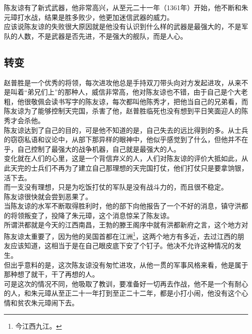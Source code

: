 \begin{multicols}{\theparacolNo}
陈友谅有了新式武器，他非常高兴，从至元二十一年（1361年）开始，他不断和朱元璋打水战，结果是胜多败少，他更加迷信武器的威力。\\

应该说陈友谅的失败很大原因就是他没有认识到什么样的武器是最强大的，不是军队的人数，不是武器是否先进，不是强大的舰队，而是人心。\\

\subsection{转变}
赵普胜是一个优秀的将领，每次进攻他总是手持双刀带头向对方发起进攻，从来不是叫着“弟兄们上”的那种人，威信非常高，他对陈友谅也不错，由于自己是个大老粗，他很敬佩会读书写字的陈友谅，每次都叫他陈秀才，把他当自己的兄弟看，而陈友谅为了能够控制天完国，杀害了他，赵普胜临死也没有想到平日笑面迎人的陈秀才会杀他。\\

陈友谅达到了自己的目的，可是他不知道的是，自己失去的远比得到的多。从士兵的窃窃私语和议论中，从部下那异样的眼神中，他似乎感觉到了什么，但他并不在乎，自己控制了最强大的战争机器，自己就是最强大的人。\\

变化就在人们的心里，这是一个背信弃义的人，人们对陈友谅的评价大抵如此，从此天完的士兵们不再为了建立自己那理想的天完国打仗，他们打仗只是要拿饷银，活下去。\\

而一支没有理想，只是为吃饭打仗的军队是没有战斗力的，而且很不稳定。\\

陈友谅很快就会尝到恶果了。\\

当陈友谅的水军不断取得胜利时，他的部下向他报告了一个不好的消息，镇守洪都的将领叛变了，投降了朱元璋，这个消息惊呆了陈友谅。\\

所谓洪都就是今天的江西南昌，王勃的滕王阁序中就有洪都新府之言，这个地方对陈友谅太重要了，因为他的吴国首都在江洲\footnote{今江西九江。}，这两个地方有多近，去过江西的朋友应该知道，这相当于是在自己眼皮底下安了个钉子。他决不允许这种情况的发生。\\

但出乎意料的是，这次陈友谅没有匆忙进攻，从他一贯的军事风格来看，他是属于那种想了就干，干了再想的人。\\

可是这次的情况不同，他吸取了教训，要准备好一切再去作战，他不是一个有耐心的人，和朱元璋从至正二十一年打到至正二十二年，都是小打小闹，他没有这个心情和贫农朱元璋闹下去。\\


\end{multicols}
